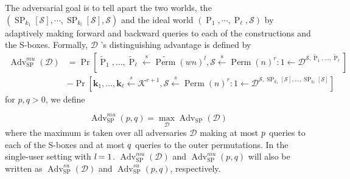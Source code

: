 The adversarial goal is to tell apart the two worlds, the $(\operatorname{SP}_{k_1}[\mathcal{S}], \cdots ,\operatorname{SP}_{k_l}[\mathcal{S}],\mathcal{S})$ and the ideal world $(\operatorname{P}_1, \cdots ,\operatorname{P}_{\ell},\mathcal{S})$ by adaptively making forward and backward queries to each of the constructions and the S-boxes. Formally, $\mathcal{D}$ 's distinguishing advantage is defined by
$$
\begin{aligned}
\operatorname{Adv}_{\mathrm{SP}}^{mu}(\mathcal{D}) &=\operatorname{Pr}\left[\widetilde{\operatorname{P}}_{1}, \ldots, \widetilde{\operatorname{P}}_{\ell} \stackrel{\mathrm{s}}{\leftarrow} \widetilde{\operatorname{Perm}}(w n)^l, \mathcal{S} \stackrel{\mathrm{s}}{\leftarrow} \operatorname{Perm}(n)^{r}: 1 \leftarrow \mathcal{D}^{\mathcal{S}, \widetilde{\operatorname{P}}_{1}, \ldots, \widetilde{\operatorname{P}}_{\ell}}\right] \\
&-\operatorname{Pr}\left[\mathbf{k}_{1}, \ldots, \mathbf{k}_{\ell} \stackrel{s}{\leftarrow} \mathcal{K}^{r+1}, \mathcal{S} \stackrel{s}{\leftarrow} \operatorname{Perm}(n)^{r}: 1 \leftarrow \mathcal{D}^{\mathcal{S}, \operatorname{SP}_{k_{1}}[\mathcal{S}], \ldots, \operatorname{SP}_{k_{\ell}}[\mathcal{S}]}\right]
\end{aligned}                                                                                                                                                                                                                        $$                                                                                                                                                                                                                                                                                                                                                                                                                                                                                                                                                                                                                                                                                                                                               for $p,q > 0$, we define

$$
\operatorname{Adv}^{mu}_{\mathrm{SP}}(p, q) = \max _{\mathcal{D}} \operatorname{Adv}_{\mathrm{SP}}(\mathcal{D})
$$
where the maximum is taken over all adversaries $\mathcal{D}$ making at most $\mathnormal{p}$ queries to each of the S-boxes and at most $\mathnormal{q}$ queries to the outer permutations. In the single-user setting with $\emph{l} = 1$. $\operatorname{Adv}^{mu}_{\mathrm{SP}}(\mathcal{D})$ and $\operatorname{Adv}^{mu}_{\mathrm{SP}}(p, q)$  will also be written as $\operatorname{Adv}^{su}_{\mathrm{SP}}(\mathcal{D})$ and $\operatorname{Adv}^{su}_{\mathrm{SP}}(p, q)$, respectively.







